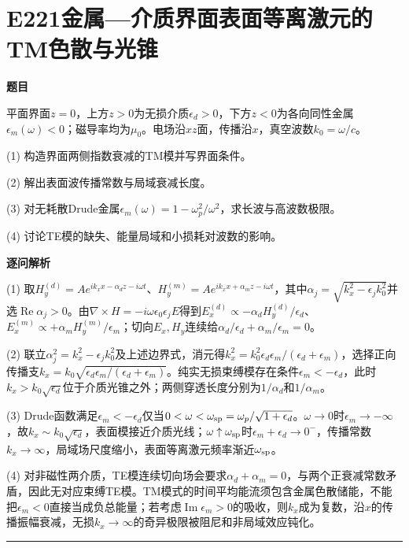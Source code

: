 \documentclass[UTF8,a4paper,11pt,oneside,openany]{ctexbook}
\begin{document}
\section*{E221\quad 金属—介质界面表面等离激元的TM色散与光锥}
\textbf{题目}\par
平面界面$z=0$，上方$z>0$为无损介质$\epsilon_d>0$，下方$z<0$为各向同性金属$\epsilon_m(\omega)<0$；磁导率均为$\mu_0$。电场沿$xz$面，传播沿$x$，真空波数$k_0=\omega/c$。
\par\smallskip\noindent (1) 构造界面两侧指数衰减的TM模并写界面条件。
\par\smallskip\noindent (2) 解出表面波传播常数与局域衰减长度。
\par\smallskip\noindent (3) 对无耗散Drude金属$\epsilon_m(\omega)=1-\omega_p^2/\omega^2$，求长波与高波数极限。
\par\smallskip\noindent (4) 讨论TE模的缺失、能量局域和小损耗对波数的影响。
\par\medskip\textbf{逐问解析}\par
\par\smallskip\noindent (1) 取$H_y^{(d)}=A e^{ik_xx-\alpha_d z-i\omega t}$、$H_y^{(m)}=A e^{ik_xx+\alpha_m z-i\omega t}$，其中$\alpha_j=\sqrt{k_x^2-\epsilon_j k_0^2}$并选$\operatorname{Re}\alpha_j>0$。由$\nabla\times H=-i\omega\epsilon_0\epsilon_jE$得到$E_x^{(d)}\propto-\alpha_d H_y^{(d)}/\epsilon_d$、$E_x^{(m)}\propto+\alpha_mH_y^{(m)}/\epsilon_m$；切向$E_x,H_y$连续给$\alpha_d/\epsilon_d+\alpha_m/\epsilon_m=0$。
\par\smallskip\noindent (2) 联立$\alpha_j^2=k_x^2-\epsilon_j k_0^2$及上述边界式，消元得$k_x^2=k_0^2\epsilon_d\epsilon_m/(\epsilon_d+\epsilon_m)$，选择正向传播支$k_x=k_0\sqrt{\epsilon_d\epsilon_m/(\epsilon_d+\epsilon_m)}$。纯实无损束缚模存在条件$\epsilon_m<-\epsilon_d$，此时$k_x>k_0\sqrt{\epsilon_d}$位于介质光锥之外；两侧穿透长度分别为$1/\alpha_d$和$1/\alpha_m$。
\par\smallskip\noindent (3) Drude函数满足$\epsilon_m<-\epsilon_d$仅当$0<\omega<\omega_{\rm sp}=\omega_p/\sqrt{1+\epsilon_d}$。$\omega\to0$时$\epsilon_m\to-\infty$，故$k_x\sim k_0\sqrt{\epsilon_d}$，表面模接近介质光线；$\omega\uparrow\omega_{\rm sp}$时$\epsilon_m+\epsilon_d\to0^-$，传播常数$k_x\to\infty$，局域场尺度缩小，表面等离激元频率渐近$\omega_{\rm sp}$。
\par\smallskip\noindent (4) 对非磁性两介质，TE模连续切向场会要求$\alpha_d+\alpha_m=0$，与两个正衰减常数矛盾，因此无对应束缚TE模。TM模式的时间平均能流须包含金属色散储能，不能把$\epsilon_m<0$直接当成负总能量；若考虑$\operatorname{Im}\epsilon_m>0$的吸收，则$k_x$成为复数，沿$x$的传播振幅衰减，无损$k_x\to\infty$的奇异极限被阻尼和非局域效应钝化。
\par\medskip\hrule\medskip
\end{document}
